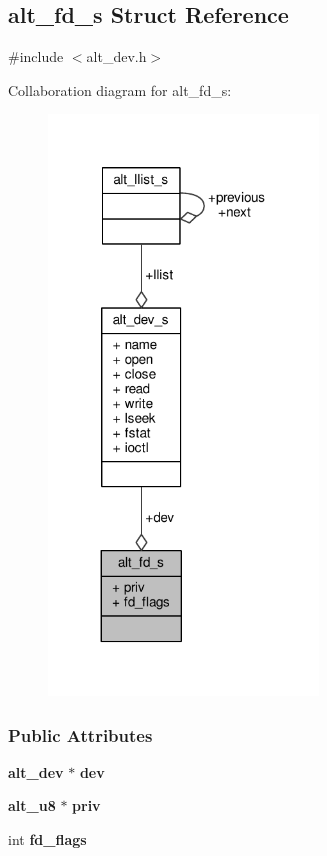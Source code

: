 \subsection{alt\+\_\+fd\+\_\+s Struct Reference}
\label{structalt__fd__s}


{\ttfamily \#include $<$alt\+\_\+dev.\+h$>$}



Collaboration diagram for alt\+\_\+fd\+\_\+s\+:
\nopagebreak
\begin{figure}[H]
\begin{center}
\leavevmode
\includegraphics[width=203pt]{d8/d89/structalt__fd__s__coll__graph}
\end{center}
\end{figure}
\subsubsection*{Public Attributes}
\begin{DoxyCompactItemize}
\item 
{\bf alt\+\_\+dev} $\ast$ {\bf dev}
\item 
{\bf alt\+\_\+u8} $\ast$ {\bf priv}
\item 
int {\bf fd\+\_\+flags}
\end{DoxyCompactItemize}


